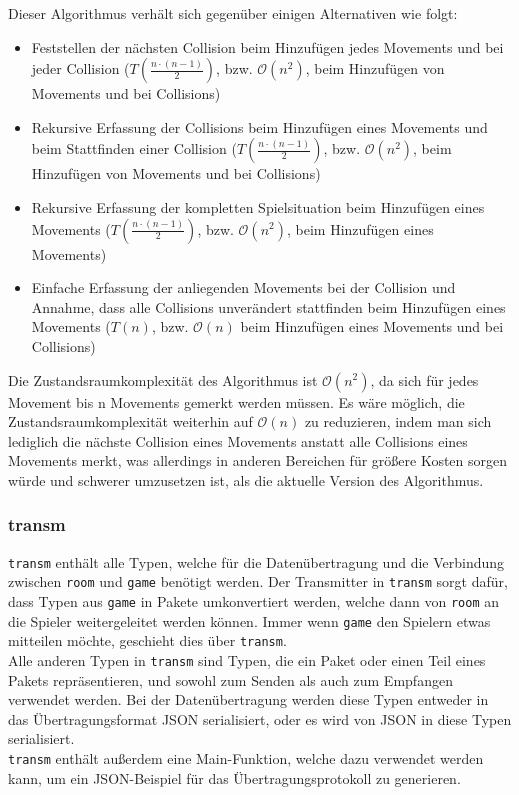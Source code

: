 Dieser Algorithmus verhält sich gegenüber einigen Alternativen wie folgt:
\begin{itemize}
	\item Feststellen der nächsten Collision beim Hinzufügen jedes Movements und bei jeder Collision 
	($T(\frac{n \cdot (n - 1)}{2})$, bzw. $\mathcal{O}(n^2)$, beim Hinzufügen von Movements und bei Collisions)
	\item Rekursive Erfassung der Collisions beim Hinzufügen eines Movements und beim Stattfinden einer Collision 
	($T(\frac{n \cdot (n - 1)}{2})$, bzw. $\mathcal{O}(n^2)$, beim Hinzufügen von Movements und bei Collisions)
	\item Rekursive Erfassung der kompletten Spielsituation beim Hinzufügen eines Movements 
	($T(\frac{n \cdot (n - 1)}{2})$, bzw. $\mathcal{O}(n^2)$, beim Hinzufügen eines Movements)
	\item Einfache Erfassung der anliegenden Movements bei der Collision und Annahme, dass alle Collisions unverändert stattfinden beim Hinzufügen eines Movements 
	($T(n)$, bzw.  $\mathcal{O}(n)$ beim Hinzufügen eines Movements und bei Collisions)
\end{itemize}
Die Zustandsraumkomplexität des Algorithmus ist $\mathcal{O}(n^2)$, da sich für jedes Movement bis n Movements gemerkt werden müssen.
Es wäre möglich, die Zustandsraumkomplexität weiterhin auf $\mathcal{O}(n)$ zu reduzieren, indem man sich lediglich die nächste Collision eines Movements anstatt alle Collisions eines Movements merkt, was allerdings in anderen Bereichen für größere Kosten sorgen würde und schwerer umzusetzen ist, als die aktuelle Version des Algorithmus.

\subsubsection{transm}
\verb+transm+ enthält alle Typen, welche für die Datenübertragung und die Verbindung zwischen \verb+room+ und \verb+game+ benötigt werden.
Der Transmitter in \verb+transm+ sorgt dafür, dass Typen aus \verb+game+ in Pakete umkonvertiert werden, welche dann von \verb+room+ an die Spieler weitergeleitet werden können. Immer wenn \verb+game+ den Spielern etwas mitteilen möchte, geschieht dies über \verb+transm+. \\
Alle anderen Typen in \verb+transm+ sind Typen, die ein Paket oder einen Teil eines Pakets repräsentieren, und sowohl zum Senden als auch zum Empfangen verwendet werden. Bei der Datenübertragung werden diese Typen entweder in das Übertragungsformat JSON serialisiert, oder es wird von JSON in diese Typen serialisiert. \\
\verb+transm+ enthält außerdem eine Main-Funktion, welche dazu verwendet werden kann, um ein JSON-Beispiel für das Übertragungsprotokoll zu generieren.

